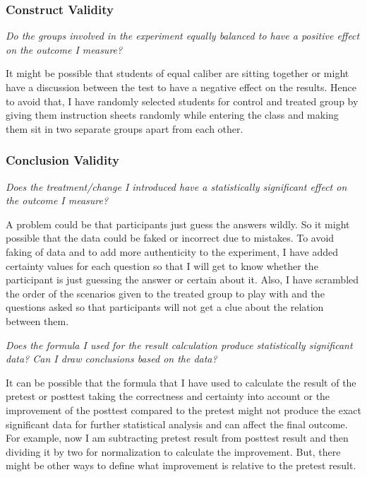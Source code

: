 \subsubsection{Construct Validity}\label{subsubsec:constructvalidity}
\emph{Do the groups involved in the experiment equally balanced to have a positive effect on the outcome I measure?}

\medskip
\noindent It might be possible that students of equal caliber are sitting together or might have a discussion between the test to have a negative effect on the results. Hence to avoid that, I have randomly selected students for control and treated group by giving them instruction sheets randomly while entering the class and making them sit in two separate groups apart from each other.

\subsubsection{Conclusion Validity}\label{subsubsec:conclusionvalidity}
\emph{Does the treatment/change I introduced have a statistically significant effect on the outcome I measure?}
	
\medskip
\noindent A problem could be that participants just guess the answers wildly. So it might possible that the data could be faked or incorrect due to mistakes. To avoid faking of data and to add more authenticity to the experiment, I have added certainty values for each question so that I will get to know whether the participant is just guessing the answer or certain about it. Also, I have scrambled the order of the scenarios given to the treated group to play with and the questions asked so that participants will not get a clue about the relation between them.

\emph{Does the formula I used for the result calculation produce statistically significant data? Can I draw conclusions based on the data?}

\medskip
\noindent It can be possible that the formula that I have used to calculate the result of the pretest or posttest taking the correctness and certainty into account or the improvement of the posttest compared to the pretest might not produce the exact significant data for further statistical analysis and can affect the final outcome. For example, now I am subtracting pretest result from posttest result and then dividing it by two for normalization to calculate the improvement. But, there might be other ways to define what improvement is relative to the pretest result.

